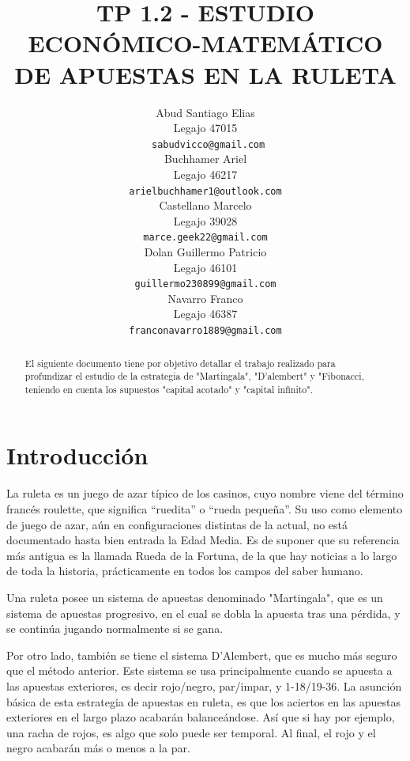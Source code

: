 \documentclass{article}
\title{TP 1.2 - ESTUDIO ECONÓMICO-MATEMÁTICO DE APUESTAS EN LA RULETA}
\author{
    Abud Santiago Elias \\
    Legajo 47015 \\
    \texttt{ sabudvicco@gmail.com} \\
    \And
    Buchhamer Ariel \\
    Legajo 46217\\
    \texttt{arielbuchhamer1@outlook.com} \\
    \And
    Castellano Marcelo \\
    Legajo 39028 \\
    \texttt{marce.geek22@gmail.com} \\
    \And
    Dolan Guillermo Patricio \\
    Legajo 46101\\
    \texttt{guillermo230899@gmail.com} \\
    \And
    Navarro Franco \\
    Legajo 46387 \\
    \texttt{franconavarro1889@gmail.com} \\
}
\begin{document}
    \maketitle
    \begin{abstract}
        El siguiente documento tiene por objetivo detallar el trabajo realizado para
        profundizar el estudio de la estrategia de "Martingala", "D'alembert" y "Fibonacci, teniendo en cuenta los supuestos "capital acotado"
        y "capital infinito".
    \end{abstract}






    \section{Introducción}
    La ruleta es un juego de azar típico de los casinos, cuyo nombre viene del término francés roulette,
    que significa ``ruedita'' o ``rueda pequeña''. Su uso como elemento de juego de azar, aún
    en configuraciones distintas de la actual, no está documentado hasta bien entrada la Edad Media.
    Es de suponer que su referencia más antigua es la llamada Rueda de la Fortuna, de la que hay
    noticias a lo largo de toda la historia, prácticamente en todos los campos del saber humano.

    Una ruleta posee un sistema de apuestas denominado "Martingala", que es un sistema de apuestas progresivo,
    en el cual se dobla la apuesta tras una pérdida, y se continúa jugando normalmente si se gana.

    Por otro lado, también se tiene el sistema D'Alembert, que es mucho más seguro que el método anterior.
    Este sistema se usa principalmente cuando se apuesta a las apuestas exteriores,
    es decir rojo/negro, par/impar, y 1-18/19-36. La asunción básica de esta estrategia de apuestas en ruleta,
    es que los aciertos en las apuestas exteriores en el largo plazo acabarán balanceándose.
    Así que si hay por ejemplo, una racha de rojos, es algo que solo puede ser temporal.
    Al final, el rojo y el negro acabarán más o menos a la par.
\end{document}
